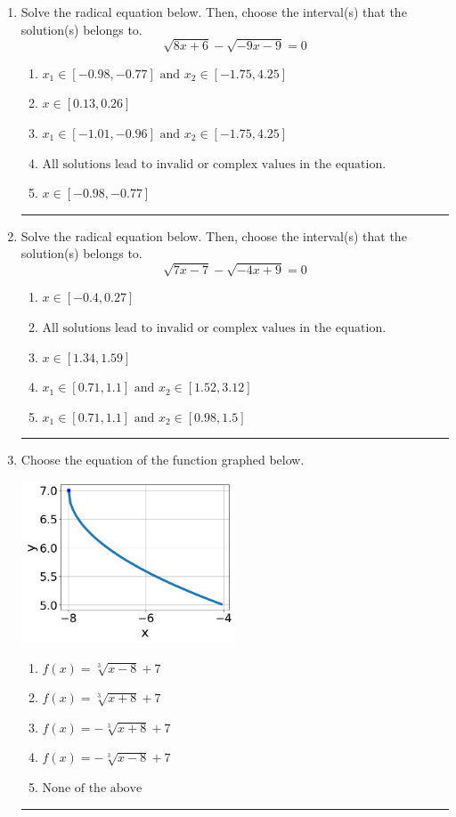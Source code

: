 \documentclass[14pt]{extbook}
\newcommand{\litem}[1]{\item#1\hspace*{-1cm}\rule{\textwidth}{0.4pt}}
\begin{document}
\begin{enumerate}
{\begin{enumerate}[label=\Alph*.]
\end{enumerate} }
\litem{
Solve the radical equation below. Then, choose the interval(s) that the solution(s) belongs to.\[ \sqrt{8 x + 6} - \sqrt{-9 x - 9} = 0 \]\begin{enumerate}[label=\Alph*.]
\item \( x_1 \in [-0.98, -0.77] \text{ and } x_2 \in [-1.75,4.25] \)
\item \( x \in [0.13,0.26] \)
\item \( x_1 \in [-1.01, -0.96] \text{ and } x_2 \in [-1.75,4.25] \)
\item \( \text{All solutions lead to invalid or complex values in the equation.} \)
\item \( x \in [-0.98,-0.77] \)

\end{enumerate} }
\litem{
Solve the radical equation below. Then, choose the interval(s) that the solution(s) belongs to.\[ \sqrt{7 x - 7} - \sqrt{-4 x + 9} = 0 \]\begin{enumerate}[label=\Alph*.]
\item \( x \in [-0.4,0.27] \)
\item \( \text{All solutions lead to invalid or complex values in the equation.} \)
\item \( x \in [1.34,1.59] \)
\item \( x_1 \in [0.71, 1.1] \text{ and } x_2 \in [1.52,3.12] \)
\item \( x_1 \in [0.71, 1.1] \text{ and } x_2 \in [0.98,1.5] \)

\end{enumerate} }
\litem{
Choose the equation of the function graphed below.
\begin{center}
    \includegraphics[width=0.5\textwidth]{../Figures/radicalGraphToEquationCopyA.png}
\end{center}
\begin{enumerate}[label=\Alph*.]
\item \( f(x) = \sqrt[3]{x - 8} + 7 \)
\item \( f(x) = \sqrt[3]{x + 8} + 7 \)
\item \( f(x) = - \sqrt[3]{x + 8} + 7 \)
\item \( f(x) = - \sqrt[3]{x - 8} + 7 \)
\item \( \text{None of the above} \)

\end{enumerate} }
\end{enumerate}
\end{document}
